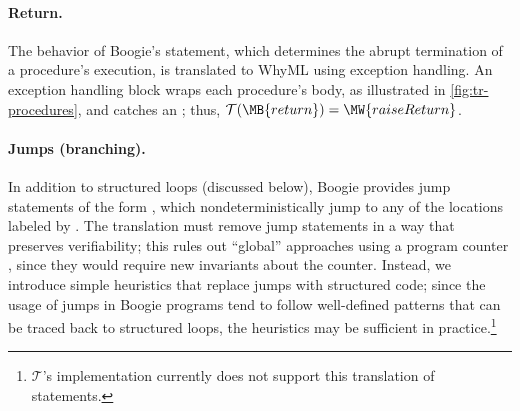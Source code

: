 \documentclass[a4paper,final]{llncs}
\makeatletter
\newif\iflong
\newcommand{\tr}{\mathcal{T}}
\newcommand{\Boogie}{Boogie\xspace}
\newcommand{\WhyML}{WhyML\xspace}
\newcommand{\tightParagraph}[1]{\paragraph{#1}}
\newcommand\tightParagraph{\@startsection{paragraph}{4}{\z@}{-5\p@ \@plus -4\p@ \@minus -4\p@}{-0.5em \@plus -0.22em \@minus -0.1em}{\normalfont\normalsize\itshape}}
\makeatother
\begin{document}
\tightParagraph{Return.}
The behavior of \Boogie's  statement, which determines the abrupt termination of a procedure's execution, is translated to \WhyML using exception handling.
An exception handling block wraps each procedure's body, as illustrated in \autoref{fig:tr-procedures}, and catches an ; thus, $\tr(\MB{return}) = \MW{raise Return}$.


\iflong
\tightParagraph{Jumps (branching).}
In addition to structured  loops (discussed below), \Boogie provides jump statements of the form , which nondeterministically jump to any of the locations labeled by .
The translation must remove jump statements in a way that preserves verifiability; this rules out ``global'' approaches using a program counter \cite{Harel-folk,TFNMO12-WCRE12}, since they would require new invariants about the counter.
Instead, we introduce simple heuristics that replace jumps with structured code; since the usage of jumps in \Boogie programs tend to follow well-defined patterns that can be traced back to structured loops, the heuristics may be sufficient in practice.\footnote{$\tr$'s implementation currently does not support this translation of  statements.}
\end{document}
